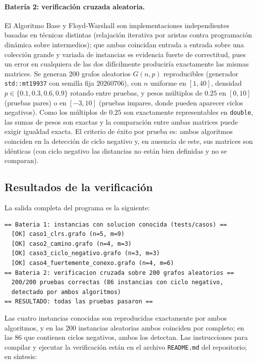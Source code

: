 \documentclass[11pt]{article}
\begin{document}
\paragraph{Batería 2: verificación cruzada aleatoria.}
El Algoritmo Base y Floyd-Warshall son implementaciones independientes
basadas en técnicas distintas (relajación iterativa por aristas contra
programación dinámica sobre intermedios); que ambas coincidan entrada a
entrada sobre una colección grande y variada de instancias es evidencia
fuerte de correctitud, pues un error en cualquiera de las dos difícilmente
produciría exactamente las mismas matrices. Se generan $200$ grafos
aleatorios $G(n,p)$ reproducibles (generador \texttt{std::mt19937} con
semilla fija $20260706$), con $n$ uniforme en $[1,40]$, densidad
$p\in\{0.1,0.3,0.6,0.9\}$ rotando entre pruebas, y pesos múltiplos de $0.25$
en $[0,10]$ (pruebas pares) o en $[-3,10]$ (pruebas impares, donde pueden
aparecer ciclos negativos). Como los múltiplos de $0.25$ son exactamente
representables en \texttt{double}, las sumas de pesos son exactas y la
comparación entre ambas matrices puede exigir igualdad exacta. El criterio
de éxito por prueba es: ambos algoritmos coinciden en la detección de ciclo
negativo y, en ausencia de este, sus matrices son idénticas (con ciclo
negativo las distancias no están bien definidas y no se comparan).

\subsection{Resultados de la verificación}

La salida completa del programa es la siguiente:

\begin{lstlisting}[style=texto]
== Bateria 1: instancias con solucion conocida (tests/casos) ==
  [OK] caso1_clrs.grafo (n=5, m=9)
  [OK] caso2_camino.grafo (n=4, m=3)
  [OK] caso3_ciclo_negativo.grafo (n=3, m=3)
  [OK] caso4_fuertemente_conexo.grafo (n=4, m=6)
== Bateria 2: verificacion cruzada sobre 200 grafos aleatorios ==
  200/200 pruebas correctas (86 instancias con ciclo negativo,
  detectado por ambos algoritmos)
== RESULTADO: todas las pruebas pasaron ==
\end{lstlisting}

Las cuatro instancias conocidas son reproducidas exactamente por ambos
algoritmos, y en las $200$ instancias aleatorias ambos coinciden por
completo; en las $86$ que contienen ciclos negativos, ambos los detectan.
Las instrucciones para compilar y ejecutar la verificación están en el
archivo \texttt{README.md} del repositorio; en síntesis:
\end{document}
